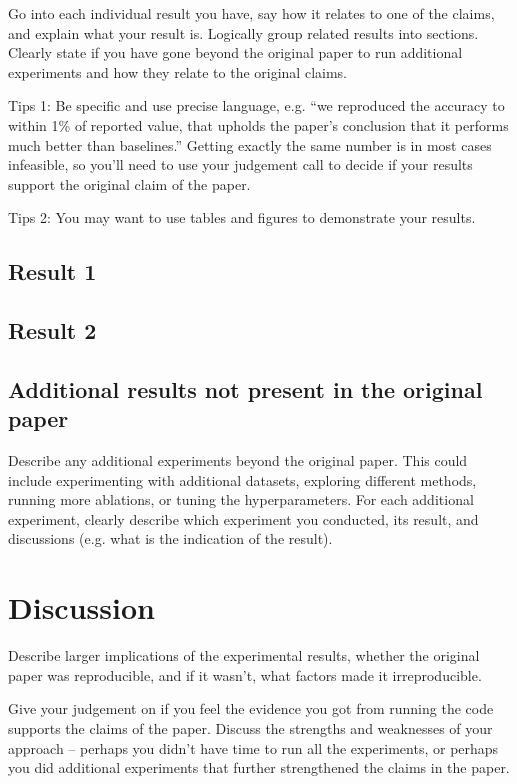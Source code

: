 \documentclass[11pt,a4paper]{article}
\begin{document}
Go into each individual result you have, say how it relates to one of the claims, and explain what your result is. Logically group related results into sections. Clearly state if you have gone beyond the original paper to run additional experiments and how they relate to the original claims. 

Tips 1: Be specific and use precise language, e.g. ``we reproduced the accuracy to within 1\% of reported value, that upholds the paper's conclusion that it performs much better than baselines.'' Getting exactly the same number is in most cases infeasible, so you'll need to use your judgement call to decide if your results support the original claim of the paper. 

Tips 2: You may want to use tables and figures to demonstrate your results.


\subsection{Result 1}

\subsection{Result 2}

\subsection{Additional results not present in the original paper}

Describe any additional experiments beyond the original paper. This could include experimenting with additional datasets, exploring different methods, running more ablations, or tuning the hyperparameters. For each additional experiment, clearly describe which experiment you conducted, its result, and discussions (e.g. what is the indication of the result).

\section{Discussion}

Describe larger implications of the experimental results, whether the original paper was reproducible, and if it wasn’t, what factors made it irreproducible. 

Give your judgement on if you feel the evidence you got from running the code supports the claims of the paper. Discuss the strengths and weaknesses of your approach -- perhaps you didn't have time to run all the experiments, or perhaps you did additional experiments that further strengthened the claims in the paper.
\end{document}
